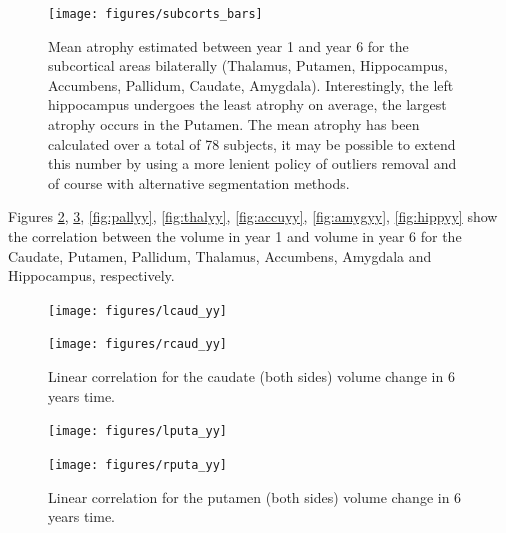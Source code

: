 \documentclass[11pt]{article}
\theoremstyle{definition}
\theoremstyle{remark}
\begin{document}
\begin{figure}[H]
        \centering
        \texttt{[image: figures/subcorts\_bars]}
        \caption{Mean atrophy estimated between year 1 and year 6 for the subcortical areas bilaterally (Thalamus, Putamen, Hippocampus, Accumbens, Pallidum, Caudate, Amygdala). Interestingly, the left hippocampus undergoes the least atrophy on average, the largest atrophy occurs in the Putamen. The mean atrophy has been calculated over a total of 78 subjects, it may be possible to extend this number by using a more lenient policy of outliers removal and of course with alternative segmentation methods.}
        \label{fig:subyybars}
\end{figure}

Figures \ref{fig:caudyy}, \ref{fig:putayy}, \ref{fig:pallyy}, \ref{fig:thalyy}, \ref{fig:accuyy}, \ref{fig:amygyy}, \ref{fig:hippyy} show the correlation between the volume in year 1 and volume in year 6 for the Caudate, Putamen, Pallidum, Thalamus, Accumbens, Amygdala and Hippocampus, respectively.

\begin{figure}[!htb]
    \centering
    \begin{minipage}{.45\textwidth}
        \centering
        \texttt{[image: figures/lcaud\_yy]} %
    \end{minipage}%
    \hfill
    \begin{minipage}{0.45\textwidth}
        \centering
        \texttt{[image: figures/rcaud\_yy]}
    \end{minipage}
    \caption{Linear correlation for the caudate (both sides) volume change in 6 years time.}
    \label{fig:caudyy}
\end{figure}

\begin{figure}[!htb]
    \centering
    \begin{minipage}{.45\textwidth}
        \centering
        \texttt{[image: figures/lputa\_yy]} %
    \end{minipage}%
    \hfill
    \begin{minipage}{0.45\textwidth}
        \centering
        \texttt{[image: figures/rputa\_yy]}
    \end{minipage}
    \caption{Linear correlation for the putamen (both sides) volume change in 6 years time.}
    \label{fig:putayy}
\end{figure}
\end{document}
